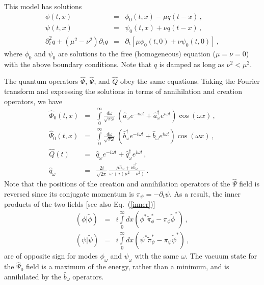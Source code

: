 \documentclass[aps,prd,showpacs,amssymb,nofootinbib,12pt]{revtex4-2}
\newcommand{\inner}[2]{\left(#1|#2\right)}
\newcommand{\nn}{\nonumber\\}
\newcommand{\bea}{\begin{eqnarray}}
\newcommand{\ea}{\end{eqnarray}}
\newcommand{\eea}{\end{eqnarray}}
\begin{document}
This model has solutions %
%
\bea
\label{eom-phi}
\phi(t,x)&=&\phi_0(t,x) - \mu  q(t-x)
\,, 
\\
\label{eom-psi}
\psi(t,x)&=&\psi_0(t,x) +\nu q(t-x) 
\,,
\\
\partial_t^2 q +(\mu^2-\nu^2)\partial_t q
&=& 
\partial_t[\mu\phi_0(t,0)+\nu\psi_0(t,0)]
\,,
\eea
%
where $\phi_0$ and $\psi_0$ are solutions to the free (homogeneous)
equation ($\mu=\nu=0$) with the above boundary conditions.
%
Note that $q$ is damped as long as $\nu^2<\mu^2$.

The quantum operators $\hat\Phi$, $\hat\Psi$, and $\hat Q$ obey the same 
equations.
%
Taking the Fourier transform and expressing the solutions in terms of
annihilation and creation operators, we have
%
\bea
\label{free-phi}
\hat\Phi_{0}(t,x)
&=&
\int\limits_0^\infty 
\frac{d\omega}{\sqrt{\pi\omega}}\,
\left(\hat a_\omega e^{-i\omega t}
+\hat a^\dagger_\omega e^{i\omega t}\right)
\cos(\omega x)
\,,
\\
\label{free-psi}
\hat\Psi_{0}(t,x)
&=&
\int\limits_0^\infty 
\frac{d\omega}{\sqrt{\pi\omega}}\,
\left(
\hat b^\dagger_\omega e^{-i\omega t}
+\hat b_\omega e^{i\omega t}\right)
\cos(\omega x)
\,,
\\
\hat Q(t)
&=& 
\hat q_\omega e^{-i\omega t} +\hat q^\dagger_\omega e^{i\omega t}
\,,
\\
\hat q_\omega 
&=& 
\frac{2i}{\sqrt{2\pi}}\,
\frac{\mu\hat a_\omega+\nu\hat b_\omega^\dagger}{\omega+i(\mu^2-\nu^2)}
\,.
\eea
%
Note that the positions of the creation and annihilation operators of the 
$\hat\Psi$ field is reversed since its conjugate momentum is 
$\pi_\psi=-\partial_t\psi$.
%
As a result, the inner products of the two fields 
[see also Eq.~(\ref{inner})]
%
\bea
\inner{\phi}{\tilde\phi}
&=&
i\int\limits_0^\infty dx
\left(\phi^*\tilde\pi_\phi^*-\pi_\phi\tilde\phi^*
\right) 
\,,
\nn
\inner{\psi}{\tilde\psi}
&=&
i\int\limits_0^\infty dx
\left(\psi^*\tilde\pi_\psi^*-\pi_\psi\tilde\psi^*
\right) 
\,,
\ea
%
are of opposite sign for modes $\phi_\omega$ and $\psi_\omega$ with the 
same $\omega$.
%
The vacuum state for the $\hat\Psi_0$ field is a maximum of the energy, 
rather than a minimum, and is annihilated by the $\hat b_\omega$ operators.
\end{document}
